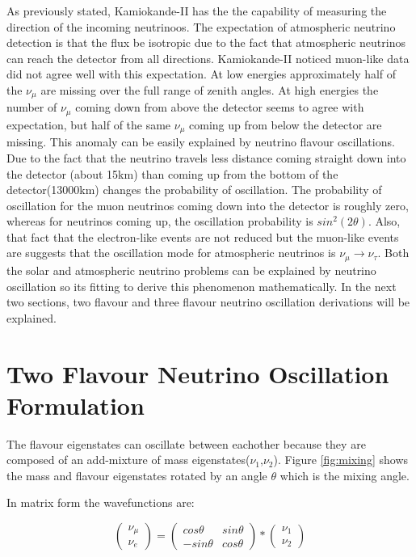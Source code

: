 As previously stated, Kamiokande-II has the the capability of measuring the direction of the incoming neutrinoos. The expectation of atmospheric neutrino detection is that the flux be isotropic due to the fact that atmospheric neutrinos can reach the detector from all directions. Kamiokande-II noticed muon-like data did not agree well with this expectation. At low energies approximately half of the $\nu_{\mu}$ are missing over the full range of zenith angles. At high energies the number of $\nu_{\mu}$ coming down from above the detector seems to agree with expectation, but half of the same $\nu_{\mu}$ coming up from below the detector are missing. This anomaly can be easily explained by neutrino flavour oscillations. Due to the fact that the neutrino travels less distance coming straight down into the detector (about 15km) than coming up from the bottom of the detector(13000km) changes the probability of oscillation. The probability of oscillation for the muon neutrinos coming down into the detector is roughly zero, whereas for neutrinos coming up, the oscillation probability is $sin^2(2\theta)$. Also, that fact that the electron-like events are not reduced but the muon-like events are suggests that the oscillation mode for atmospheric neutrinos is $\nu_{\mu} \rightarrow \nu_{\tau}$. 
Both the solar and atmospheric neutrino problems can be explained by neutrino oscillation so its fitting to derive this phenomenon mathematically. In the next two sections, two flavour and three flavour neutrino oscillation derivations will be explained. 


\section{Two Flavour Neutrino Oscillation Formulation}
The flavour eigenstates can oscillate between eachother because they are composed of an add-mixture of mass eigenstates($\nu_{1}$,$\nu_{2}$). Figure \ref{fig:mixing} shows the mass and flavour eigenstates rotated by an angle $\theta$ which is the mixing angle. 

In matrix form the wavefunctions are:

\begin{equation}
\begin{pmatrix}
\nu_{\mu} \\
\nu_{e}
\end{pmatrix} 
 = \begin{pmatrix}
cos\theta & sin\theta \\
-sin\theta & cos\theta 
\end{pmatrix}*
\begin{pmatrix}
\nu_{1} \\
\nu_{2} 
\end{pmatrix}
\end{equation}


